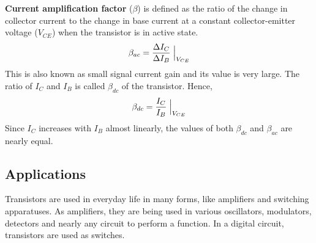 \begin{enumerate}
    \textbf{Current amplification factor} ($\beta$) is defined as the ratio of the change in collector current to the change in base current at a constant collector-emitter voltage ($V_{CE}$) when the transistor is in active state.
    \begin{align}
        \beta_{ac} = \frac{\Delta I_C}{\Delta I_B}\Bigm|_{V_{CE}}
    \end{align}
    This is also known as small signal current gain and its value is very large. The ratio of $I_C$ and $I_B$ is called $\beta_{dc}$ of the transistor. Hence,
    \begin{align}
        \beta_{dc} = \frac{I_C}{I_B}\Bigm|_{V_{CE}}
    \end{align}
    Since $I_C$ increases with $I_B$ almost linearly, the values of both $\beta_{dc}$ and $\beta_{ac}$ are nearly equal.

\end{enumerate}

\subsection*{Applications}

Transistors are used in everyday life in many forms, like amplifiers and switching apparatuses. As amplifiers, they are being used in various oscillators, modulators, detectors and nearly any circuit to perform a function. In a digital circuit, transistors are used as switches.